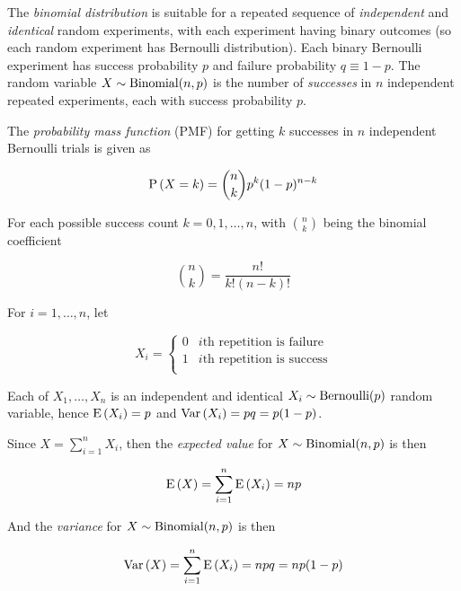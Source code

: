 \begin{definition}
    The \textit{binomial distribution} is suitable for a repeated sequence of
    \textit{independent} and \textit{identical} random experiments, with each
    experiment having binary outcomes (so each random experiment has Bernoulli
    distribution). Each binary Bernoulli experiment has success probability
    $p$ and failure probability $q \equiv 1 - p$. The random variable
    $X \sim \mathrm{Binomial}(n, p)$ is the number of \textit{successes} in $n$
    independent repeated experiments, each with success probability $p$.

    The \textit{probability mass function} (PMF) for getting $k$ successes in
    $n$ independent Bernoulli trials is given as

    \begin{equation}
        \mathrm{P} \left( X = k \right) = \binom{n}{k} p^k (1 - p)^{n - k}
    \end{equation}

    For each possible success count $k = 0, 1, \dots, n$, with $\binom{n}{k}$
    being the binomial coefficient

    \begin{equation}
        \binom{n}{k} = \frac{n!}{k!(n-k)!}
    \end{equation}

    For $i = 1, \dots, n$, let

    \begin{equation}
        X_i = \begin{cases}
            0 & \text{$i$th repetition is failure} \\
            1 & \text{$i$th repetition is success} \\
        \end{cases}
    \end{equation}

    Each of $X_1, \dots, X_n$ is an independent and identical
    $X_i \sim \mathrm{Bernoulli}(p)$ random variable, hence
    $\mathrm{E} \left( X_i \right) = p$ and $\mathrm{Var} \left( X_i \right) = pq = p(1 - p)$.

    Since $X = \sum \limits_{i=1}^n X_i$, then the \textit{expected value} for
    $X \sim \mathrm{Binomial}(n, p)$ is then

    \begin{equation}
        \mathrm{E} \left( X \right) = \sum \limits_{i=1}^n \mathrm{E} \left( X_i \right) = np
    \end{equation}

    And the \textit{variance} for $X \sim \mathrm{Binomial}(n, p)$ is then

    \begin{equation}
        \mathrm{Var} \left( X \right) = \sum \limits_{i=1}^n \mathrm{E} \left( X_i \right) = npq = np(1-p)
    \end{equation}
\end{definition}

